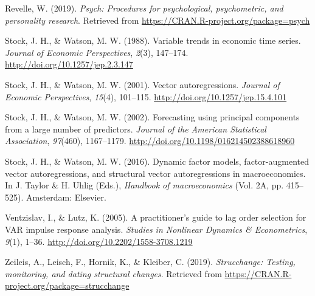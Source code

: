 \documentclass[12pt,twoside]{reedthesis}
\begin{document}
\leavevmode\hypertarget{ref-R-psych}{}%
Revelle, W. (2019). \emph{Psych: Procedures for psychological, psychometric, and personality research}. Retrieved from \url{https://CRAN.R-project.org/package=psych}

\leavevmode\hypertarget{ref-stocwats:1988}{}%
Stock, J. H., \& Watson, M. W. (1988). Variable trends in economic time series. \emph{Journal of Economic Perspectives}, \emph{2}(3), 147--174. \url{http://doi.org/10.1257/jep.2.3.147}

\leavevmode\hypertarget{ref-stocwats:2001}{}%
Stock, J. H., \& Watson, M. W. (2001). Vector autoregressions. \emph{Journal of Economic Perspectives}, \emph{15}(4), 101--115. \url{http://doi.org/10.1257/jep.15.4.101}

\leavevmode\hypertarget{ref-stocwats:2002}{}%
Stock, J. H., \& Watson, M. W. (2002). Forecasting using principal components from a large number of predictors. \emph{Journal of the American Statistical Association}, \emph{97}(460), 1167--1179. \url{http://doi.org/10.1198/016214502388618960}

\leavevmode\hypertarget{ref-stocwats:2016}{}%
Stock, J. H., \& Watson, M. W. (2016). Dynamic factor models, factor-augmented vector autoregressions, and structural vector autoregressions in macroeconomics. In J. Taylor \& H. Uhlig (Eds.), \emph{Handbook of macroeconomics} (Vol. 2A, pp. 415--525). Amsterdam: Elsevier.

\leavevmode\hypertarget{ref-ventlutz:2005}{}%
Ventzislav, I., \& Lutz, K. (2005). A practitioner's guide to lag order selection for VAR impulse response analysis. \emph{Studies in Nonlinear Dynamics \& Econometrics}, \emph{9}(1), 1--36. \url{http://doi.org/10.2202/1558-3708.1219}

\leavevmode\hypertarget{ref-R-strucchange}{}%
Zeileis, A., Leisch, F., Hornik, K., \& Kleiber, C. (2019). \emph{Strucchange: Testing, monitoring, and dating structural changes}. Retrieved from \url{https://CRAN.R-project.org/package=strucchange}


\end{document}

